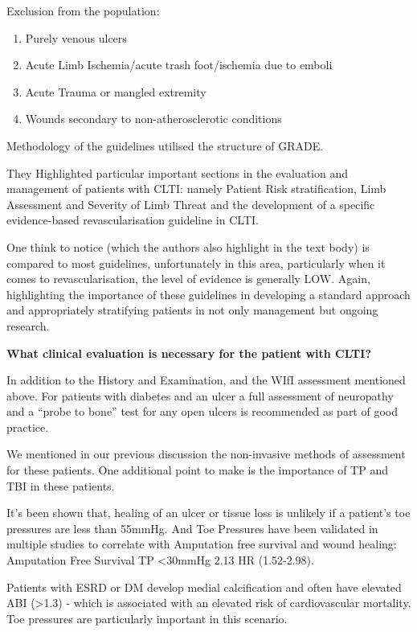 \documentclass[
]{book}
\begin{document}
Exclusion from the population:

\begin{enumerate}
\def\labelenumi{\arabic{enumi}.}
\item
  Purely venous ulcers
\item
  Acute Limb Ischemia/acute trash foot/ischemia due to emboli
\item
  Acute Trauma or mangled extremity
\item
  Wounds secondary to non-atherosclerotic conditions
\end{enumerate}

Methodology of the guidelines utilised the structure of GRADE.

They Highlighted particular important sections in the evaluation and
management of patients with CLTI: namely Patient Risk stratification,
Limb Assessment and Severity of Limb Threat and the development of a
specific evidence-based revascularisation guideline in CLTI.

One think to notice (which the authors also highlight in the text body)
is compared to most guidelines, unfortunately in this area, particularly
when it comes to revascularisation, the level of evidence is generally
LOW. Again, highlighting the importance of these guidelines in
developing a standard approach and appropriately stratifying patients in
not only management but ongoing research.

\textbf{What clinical evaluation is necessary for the patient with CLTI?}

In addition to the History and Examination, and the WIfI assessment
mentioned above. For patients with diabetes and an ulcer a full
assessment of neuropathy and a ``probe to bone'' test for any open ulcers
is recommended as part of good practice.

We mentioned in our previous discussion the non-invasive methods of
assessment for these patients. One additional point to make is the
importance of TP and TBI in these patients.

It's been shown that, healing of an ulcer or tissue loss is unlikely if
a patient's toe pressures are less than 55mmHg. And Toe Pressures have
been validated in multiple studies to correlate with Amputation free
survival and wound healing: Amputation Free Survival TP \textless30mmHg 2.13 HR
(1.52-2.98). \citep{wickström2017, hicks2018}

Patients with ESRD or DM develop medial calcification and often have
elevated ABI (\textgreater1.3) - which is associated with an elevated risk of
cardiovascular mortality. Toe pressures are particularly important in
this scenario. \citep{resnick2004, vitti1994}
\end{document}
